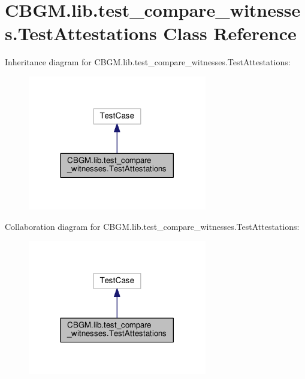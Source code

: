 \hypertarget{classCBGM_1_1lib_1_1test__compare__witnesses_1_1TestAttestations}{}\section{C\+B\+G\+M.\+lib.\+test\+\_\+compare\+\_\+witnesses.\+Test\+Attestations Class Reference}
\label{classCBGM_1_1lib_1_1test__compare__witnesses_1_1TestAttestations}


Inheritance diagram for C\+B\+G\+M.\+lib.\+test\+\_\+compare\+\_\+witnesses.\+Test\+Attestations\+:
\nopagebreak
\begin{figure}[H]
\begin{center}
\leavevmode
\includegraphics[width=221pt]{classCBGM_1_1lib_1_1test__compare__witnesses_1_1TestAttestations__inherit__graph}
\end{center}
\end{figure}


Collaboration diagram for C\+B\+G\+M.\+lib.\+test\+\_\+compare\+\_\+witnesses.\+Test\+Attestations\+:
\nopagebreak
\begin{figure}[H]
\begin{center}
\leavevmode
\includegraphics[width=221pt]{classCBGM_1_1lib_1_1test__compare__witnesses_1_1TestAttestations__coll__graph}
\end{center}
\end{figure}

